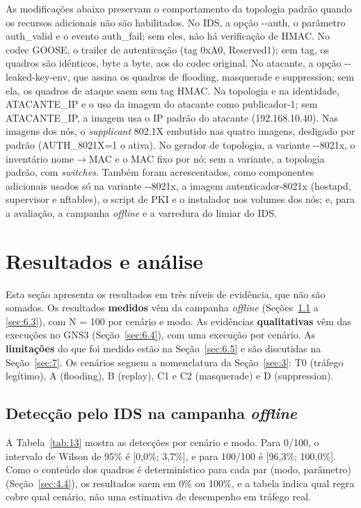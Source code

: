 \documentclass[12pt]{article}
\begin{document}
As modificações abaixo preservam o comportamento da topologia padrão quando os recursos adicionais não são habilitados. No IDS, a opção -{}-auth, o parâmetro auth\_\allowbreak{}valid e o evento auth\_\allowbreak{}fail; sem eles, não há verificação de HMAC. No codec GOOSE, o trailer de autenticação (tag 0xA0, Reserved1); sem tag, os quadros são idênticos, byte a byte, aos do codec original. No atacante, a opção -{}-leaked-key-env, que assina os quadros de flooding, masquerade e suppression; sem ela, os quadros de ataque saem sem tag HMAC. Na topologia e na identidade, ATACANTE\_\allowbreak{}IP e o uso da imagem do atacante como publicador-1; sem ATACANTE\_\allowbreak{}IP, a imagem usa o IP padrão do atacante (192.168.10.40). Nas imagens dos nós, o \emph{supplicant} 802.1X embutido nas quatro imagens, desligado por padrão (AUTH\_\allowbreak{}8021X=1 o ativa). No gerador de topologia, a variante -{}-8021x, o inventário nome\ensuremath{\rightarrow}MAC e o MAC fixo por nó; sem a variante, a topologia padrão, com \emph{switches}. Também foram acrescentados, como componentes adicionais usados só na variante -{}-8021x, a imagem autenticador-8021x (hostapd, supervisor e nftables), o script de PKI e o instalador nos volumes dos nós; e, para a avaliação, a campanha \emph{offline} e a varredura do limiar do IDS.

\section{Resultados e análise}\label{sec:6}

Esta seção apresenta os resultados em três níveis de evidência, que não são somados. Os resultados \textbf{medidos} vêm da campanha \emph{offline} (Seções~\ref{sec:6.1} a \ref{sec:6.3}), com N = 100 por cenário e modo. As evidências \textbf{qualitativas} vêm das execuções no GNS3 (Seção~\ref{sec:6.4}), com uma execução por cenário. As \textbf{limitações} do que foi medido estão na Seção~\ref{sec:6.5} e são discutidas na Seção~\ref{sec:7}. Os cenários seguem a nomenclatura da Seção~\ref{sec:3}: T0 (tráfego legítimo), A (flooding), B (replay), C1 e C2 (masquerade) e D (suppression).

\subsection{Detecção pelo IDS na campanha \emph{offline}}\label{sec:6.1}

A Tabela~\ref{tab:13} mostra as detecções por cenário e modo. Para 0/100, o intervalo de Wilson de 95\% é [0,0\%; 3,7\%], e para 100/100 é [96,3\%; 100,0\%]. Como o conteúdo dos quadros é determinístico para cada par (modo, parâmetro) (Seção~\ref{sec:4.4}), os resultados saem em 0\% ou 100\%, e a tabela indica qual regra cobre qual cenário, não uma estimativa de desempenho em tráfego real.
\end{document}
